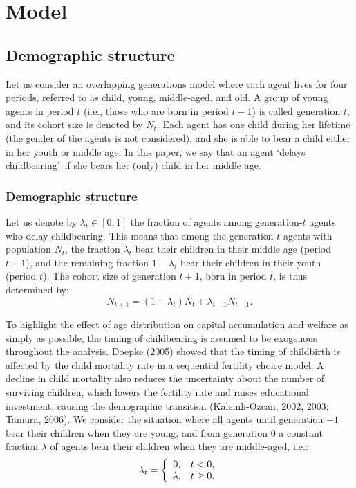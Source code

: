 \documentclass{MBE}%
\begin{document}
{\section{Model\label{sec:Model}}

\subsection{Demographic structure}



Let us consider an overlapping generations model where each agent lives for
four periods, referred to as child, young, middle-aged, and old. A group of
young agents in period $t$ (i.e., those who are born in period $t-1$) is
called generation $t$, and its cohort size is denoted by $N_{t}$. Each agent
has one child during her lifetime (the gender of the agents is not
considered), and she is able to bear a child either in her youth or middle
age. In this paper, we say that an agent `delays childbearing'\ if she bears
her (only) child in her middle age.

\subsubsection{Demographic structure}

Let us denote by $\lambda_{t}\in\left[  0,1\right]  $ the fraction of agents
among generation-$t$ agents who delay childbearing. This means that among the
generation-$t$ agents with population $N_{t}$, the fraction $\lambda_{t}$ bear
their children in their middle age (period $t+1$), and the remaining fraction
$1-\lambda_{t}$ bear their children in their youth (period $t$). The cohort
size of generation $t+1$, born in period $t$, is thus determined by:%
\begin{equation}
N_{t+1}=\left(  1-\lambda_{t}\right)  N_{t}+\lambda_{t-1}N_{t-1}.
\label{eq:PopDyn}%
\end{equation}


To highlight the effect of age distribution on capital accumulation and welfare as simply as
possible, the timing of childbearing is assumed to be exogenous throughout the analysis. {Doepke
(2005) showed that the timing of childbirth is affected by the child mortality rate in a
sequential fertility choice model. A decline in child mortality also reduces the uncertainty about
the number of surviving children, which lowers the fertility rate and raises educational
investment, causing the demographic transition (Kalemli-Ozcan, 2002, 2003; Tamura, 2006).} We
consider the situation where all agents until generation $-1$ bear their children when they are
young, and from generation 0 a constant fraction $\lambda$ of agents bear their children when they
are middle-aged, i.e.:
\begin{equation}
\lambda_{t}=\left\{
\begin{array}
[c]{cc}%
0, & t<0,\\
\lambda, & t\geq0.
\end{array}
\right.  \label{eq:lambda}%
\end{equation}


}
\end{document}
